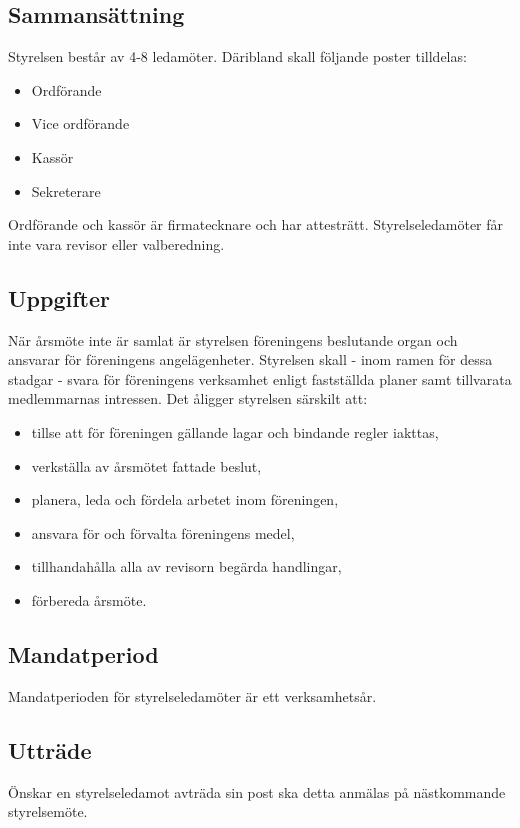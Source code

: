 \documentclass[a4paper,11pt]{article}
\begin{document}
\subsection{Sammansättning}

Styrelsen består av 4-8 ledamöter. Däribland skall följande poster tilldelas:

\begin{itemize}
    \item Ordförande
    \item Vice ordförande
    \item Kassör
    \item Sekreterare
\end{itemize}

Ordförande och kassör är firmatecknare och har attesträtt. Styrelseledamöter får inte vara revisor eller valberedning.

\subsection{Uppgifter}
När årsmöte inte är samlat är styrelsen föreningens beslutande organ och ansvarar för föreningens angelägenheter. Styrelsen skall - inom ramen för dessa stadgar - svara för föreningens verksamhet enligt
fastställda planer samt tillvarata medlemmarnas intressen.
Det åligger styrelsen särskilt att:
\begin{itemize}
    \item tillse att för föreningen gällande lagar och bindande regler iakttas,
    \item verkställa av årsmötet fattade beslut,
    \item planera, leda och fördela arbetet inom föreningen,
    \item ansvara för och förvalta föreningens medel,
    \item tillhandahålla alla av revisorn begärda handlingar,
    \item förbereda årsmöte.
\end{itemize}

\subsection{Mandatperiod}
Mandatperioden för styrelseledamöter är ett verksamhetsår.

\subsection{Utträde}
Önskar en styrelseledamot avträda sin post ska detta anmälas på nästkommande styrelsemöte.
\end{document}
